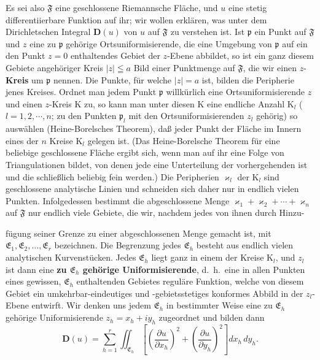 \documentclass{article}
\begin{document}
Es sei also $\mathfrak{F}$ eine geschlossene Riemannsche Fläche, und $u$ eine stetig differentiierbare Funktion auf ihr; wir wollen erklären, was unter dem Dirichletschen Integral $\mathbf{D}(u)$ von $u$ auf $\mathfrak{F}$ zu verstehen ist. Ist $\mathfrak{p}$ ein Punkt auf $\mathfrak{F}$ und $z$ eine zu $\mathfrak{p}$ gehörige Ortsuniformisierende, die eine Umgebung von $\mathfrak{p}$ auf ein den Punkt $z = 0$ enthaltendes Gebiet der $z$-Ebene abbildet, so ist ein ganz diesem Gebiete angehöriger Kreis $|z| \leqq a$ Bild einer Punktmenge auf $\mathfrak{F}$, die wir einen $z$-\textbf{Kreis} um $\mathfrak{p}$ nennen. Die Punkte, für welche $|z| = a$ ist, bilden die Peripherie jenes Kreises. Ordnet man jedem Punkt $\mathfrak{p}$ willkürlich eine Ortsuniformisierende $z$ und einen $z$-Kreis $\mathrm{K}$ zu, so kann man unter diesen $\mathrm{K}$ eine endliche Anzahl $\mathrm{K}_l$ ($l = 1, 2, \cdots, n$; zu den Punkten $\mathfrak{p}_l$ mit den Ortsuniformisierenden $z_l$ gehörig) so auswählen (Heine-Borelsches Theorem), daß jeder Punkt der Fläche im Innern eines der $n$ Kreise $\mathrm{K}_l$ gelegen ist. (Das Heine-Borelsche Theorem für eine beliebige geschlossene Fläche ergibt sich, wenn man auf ihr eine Folge von Triangulationen bildet, von denen jede eine Unterteilung der vorhergehenden ist und die schließlich beliebig fein werden.) Die Peripherien $\varkappa_l$ der $\mathrm{K}_l$ sind geschlossene analytische Linien und schneiden sich daher nur in endlich vielen Punkten. Infolgedessen bestimmt die abgeschlossene Menge $\varkappa_1 + \varkappa_2 + \cdots + \varkappa_n$ auf $\mathfrak{F}$ nur endlich viele Gebiete, die wir, nachdem jedes von ihnen durch Hinzu-

fügung seiner Grenze zu einer abgeschlossenen Menge gemacht ist, mit $\mathfrak{E}_1, \mathfrak{E}_2, \dots, \mathfrak{E}_r$ bezeichnen. Die Begrenzung jedes $\mathfrak{E}_h$ besteht aus endlich vielen analytischen Kurvenstücken. Jedes $\mathfrak{E}_h$ liegt ganz in einem der Kreise $\mathrm{K}_l$, und $z_l$ ist dann eine \textbf{zu $\mathfrak{E}_h$ gehörige Uniformisierende}, d.~h.\ eine in allen Punkten eines gewissen, $\mathfrak{E}_h$ enthaltenden Gebietes reguläre Funktion, welche von diesem Gebiet ein umkehrbar-eindeutiges und -gebietsstetiges konformes Abbild in der $z_l$-Ebene entwirft. Wir denken uns jedem $\mathfrak{E}_h$ in bestimmter Weise eine zu $\mathfrak{E}_h$ gehörige Uniformisierende $z_h = x_h + i y_h$ zugeordnet und bilden dann
\[ \mathbf{D}(u) = \sum_{h=1}^r \iint_{\mathfrak{E}_h} \left[ \left(\frac{\partial u}{\partial x_h}\right)^2 + \left(\frac{\partial u}{\partial y_h}\right)^2 \right] dx_h\,dy_h. \]
\end{document}

